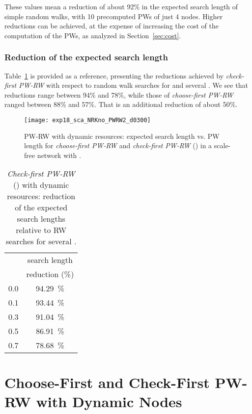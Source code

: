 \documentclass[]{elsarticle}
\begin{document}
These values mean a reduction of about 92\% in the expected search length of simple random walks, with 10 precomputed PWs of just 4 nodes. Higher reductions can be achieved, at the expense of increasing the cost of the computation of the PWs, as analyzed in Section~\ref{sec:cost}. \\


\subsubsection{Reduction of the expected search length}

Table~\ref{tab:H_reduction_RW_PWRW2} is provided as a reference, presenting the reductions achieved by \emph{check-first PW-RW} with respect to random walk searches for   and several \pd. We see that reductions range between 94\% and 78\%, while those of \emph{choose-first PW-RW} ranged between 88\% and 57\%. That is an additional reduction of about 50\%.

\begin{figure}
 \centering
 \texttt{[image: exp18\_sca\_NRKno\_PWRW2\_d0300]}
 \caption{PW-RW with dynamic resources: expected search length  vs. PW length  for \emph{choose-first PW-RW} and \emph{check-first PW-RW} () in a scale-free network with .}
 \label{fig:scalefree_pw1_pw2}
\end{figure}

\begin{table}
\centering
\begin{tabular}{|c|c|}
\hline
\rule{0pt}{11pt}   & search length \\ 
                & reduction (\%)\\ \hline
              0.0  &  94.29~\%\\
              0.1  & 93.44~\%\\
              0.3  & 91.04~\%\\
              0.5  & 86.91~\%\\
              0.7  & 78.68~\%\\
\hline
\end{tabular}
\caption{\emph{Check-first PW-RW} () with dynamic resources: reduction of the expected search lengths relative to RW searches for several \pd.}
\label{tab:H_reduction_RW_PWRW2}
\end{table}


\section{Choose-First and Check-First PW-RW with Dynamic Nodes}
\label{sec:dyn_nodes}
\end{document}
